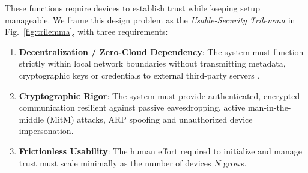 \documentclass[conference,a4paper]{IEEEtran}
\begin{document}
These functions require devices to establish trust while keeping setup manageable. We frame this design problem as the \textit{Usable-Security Trilemma} in Fig.~\ref{fig:trilemma}, with three requirements:
\begin{enumerate}
    \item \textbf{Decentralization / Zero-Cloud Dependency}: The system must function strictly within local network boundaries without transmitting metadata, cryptographic keys or credentials to external third-party servers \cite{kleppmann2019localfirst}.
    \item \textbf{Cryptographic Rigor}: The system must provide authenticated, encrypted communication resilient against passive eavesdropping, active man-in-the-middle (MitM) attacks, ARP spoofing and unauthorized device impersonation.
    \item \textbf{Frictionless Usability}: The human effort required to initialize and manage trust must scale minimally as the number of devices $N$ grows.
\end{enumerate}
\end{document}

